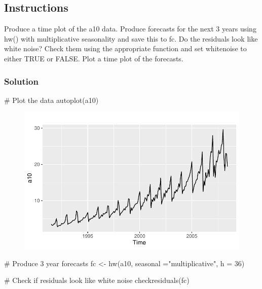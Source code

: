 \documentclass[
  letterpaper,
  DIV=11,
  numbers=noendperiod]{scrartcl}
\newenvironment{Shaded}{\begin{snugshade}}{\end{snugshade}}
\newcommand{\AttributeTok}[1]{\textcolor[rgb]{0.40,0.45,0.13}{#1}}
\newcommand{\CommentTok}[1]{\textcolor[rgb]{0.37,0.37,0.37}{#1}}
\newcommand{\DecValTok}[1]{\textcolor[rgb]{0.68,0.00,0.00}{#1}}
\newcommand{\FunctionTok}[1]{\textcolor[rgb]{0.28,0.35,0.67}{#1}}
\newcommand{\NormalTok}[1]{\textcolor[rgb]{0.00,0.23,0.31}{#1}}
\newcommand{\OtherTok}[1]{\textcolor[rgb]{0.00,0.23,0.31}{#1}}
\newcommand{\StringTok}[1]{\textcolor[rgb]{0.13,0.47,0.30}{#1}}
\begin{document}
\hypertarget{instructions-11}{%
\subsection{Instructions}\label{instructions-11}}

Produce a time plot of the a10 data. Produce forecasts for the next 3
years using hw() with multiplicative seasonality and save this to fc. Do
the residuals look like white noise? Check them using the appropriate
function and set whitenoise to either TRUE or FALSE. Plot a time plot of
the forecasts.

\hypertarget{solution}{%
\subsubsection{Solution}\label{solution}}

\begin{Shaded}
\begin{Highlighting}[]
\CommentTok{\# Plot the data}
\FunctionTok{autoplot}\NormalTok{(a10)}
\end{Highlighting}
\end{Shaded}

\begin{figure}[H]

{\centering \includegraphics{forecasting_datacamp_ex_files/figure-pdf/unnamed-chunk-16-1.pdf}

}

\end{figure}

\begin{Shaded}
\begin{Highlighting}[]
\CommentTok{\# Produce 3 year forecasts}
\NormalTok{fc }\OtherTok{\textless{}{-}} \FunctionTok{hw}\NormalTok{(a10, }\AttributeTok{seasonal =}\StringTok{"multiplicative"}\NormalTok{, }\AttributeTok{h =} \DecValTok{36}\NormalTok{)}

\CommentTok{\# Check if residuals look like white noise}
\FunctionTok{checkresiduals}\NormalTok{(fc)}
\end{Highlighting}
\end{Shaded}
\end{document}
